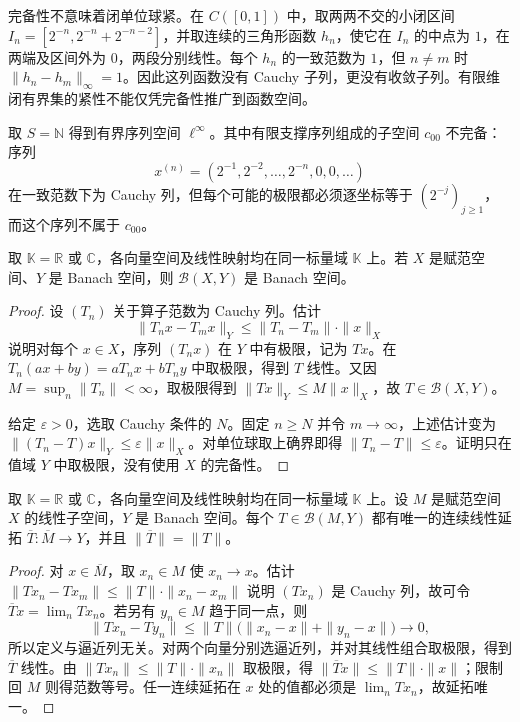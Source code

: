 完备性不意味着闭单位球紧。在 \(C([0,1])\) 中，取两两不交的小闭区间
\(I_n=[2^{-n},2^{-n}+2^{-n-2}]\)，并取连续的三角形函数 \(h_n\)，使它在 \(I_n\) 的中点为 \(1\)，在两端及区间外为 \(0\)，两段分别线性。每个 \(h_n\) 的一致范数为 \(1\)，但 \(n\ne m\) 时 \(\|h_n-h_m\|_\infty=1\)。因此这列函数没有 Cauchy 子列，更没有收敛子列。有限维闭有界集的紧性不能仅凭完备性推广到函数空间。

\ProseParagraphBreak

取 \(S=\mathbb N\) 得到有界序列空间 \(\ell^\infty\)。其中有限支撑序列组成的子空间 \(c_{00}\) 不完备：序列
\[
x^{(n)}=(2^{-1},2^{-2},\ldots,2^{-n},0,0,\ldots)
\]
在一致范数下为 Cauchy 列，但每个可能的极限都必须逐坐标等于 \((2^{-j})_{j\geq1}\)，而这个序列不属于 \(c_{00}\)。

\begin{theorem}\label{b1:thm:operator-space-complete}
取 \(\mathbb K=\mathbb R\) 或 \(\mathbb C\)，各向量空间及线性映射均在同一标量域 \(\mathbb K\) 上。若 \(X\) 是赋范空间、\(Y\) 是 Banach 空间，则 \(\mathcal B(X,Y)\) 是 Banach 空间。
\end{theorem}
\begin{proof}
设 \((T_n)\) 关于算子范数为 Cauchy 列。估计
\[
\|T_nx-T_mx\|_Y\leq\|T_n-T_m\|\cdot\|x\|_X
\]
说明对每个 \(x\in X\)，序列 \((T_nx)\) 在 \(Y\) 中有极限，记为 \(Tx\)。在 \(T_n(ax+by)=aT_nx+bT_ny\) 中取极限，得到 \(T\) 线性。又因 \(M=\sup_n\|T_n\|<\infty\)，取极限得到 \(\|Tx\|_Y\leq M\|x\|_X\)，故 \(T\in\mathcal B(X,Y)\)。

给定 \(\varepsilon>0\)，选取 Cauchy 条件的 \(N\)。固定 \(n\geq N\) 并令 \(m\to\infty\)，上述估计变为 \(\|(T_n-T)x\|_Y\leq\varepsilon\|x\|_X\)。对单位球取上确界即得 \(\|T_n-T\|\leq\varepsilon\)。证明只在值域 \(Y\) 中取极限，没有使用 \(X\) 的完备性。
\end{proof}

\begin{proposition}\label{b1:prop:continuous-extension-closure}
取 \(\mathbb K=\mathbb R\) 或 \(\mathbb C\)，各向量空间及线性映射均在同一标量域 \(\mathbb K\) 上。设 \(M\) 是赋范空间 \(X\) 的线性子空间，\(Y\) 是 Banach 空间。每个 \(T\in\mathcal B(M,Y)\) 都有唯一的连续线性延拓 \(\overline T:\overline M\rightarrow Y\)，并且 \(\|\overline T\|=\|T\|\)。
\end{proposition}
\begin{proof}
对 \(x\in\overline M\)，取 \(x_n\in M\) 使 \(x_n\to x\)。估计 \(\|Tx_n-Tx_m\|\leq\|T\|\cdot\|x_n-x_m\|\) 说明 \((Tx_n)\) 是 Cauchy 列，故可令 \(\overline Tx=\lim_nTx_n\)。若另有 \(y_n\in M\) 趋于同一点，则
\[
\|Tx_n-Ty_n\|\leq\|T\|\bigl(\|x_n-x\|+\|y_n-x\|\bigr)\longrightarrow0,
\]
所以定义与逼近列无关。对两个向量分别选逼近列，并对其线性组合取极限，得到 \(\overline T\) 线性。由 \(\|Tx_n\|\leq\|T\|\cdot\|x_n\|\) 取极限，得 \(\|\overline Tx\|\leq\|T\|\cdot\|x\|\)；限制回 \(M\) 则得范数等号。任一连续延拓在 \(x\) 处的值都必须是 \(\lim_nTx_n\)，故延拓唯一。
\end{proof}

